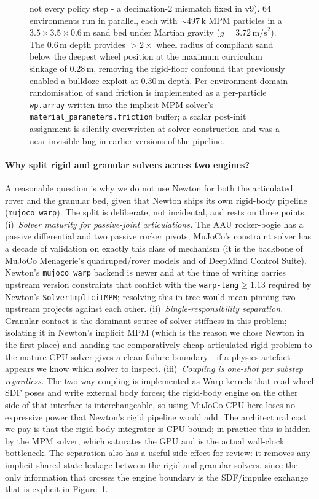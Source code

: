 \documentclass[conference]{IEEEtran}
\begin{document}
\begin{figure}[!htbp]
{    not every policy step - a decimation-2 mismatch fixed in v9). 64
    environments run in parallel, each with ${\sim}497$\,k MPM particles in a
    $3.5\times3.5\times0.6$\,m sand bed under Martian gravity
    ($g{=}3.72\,\text{m/s}^2$). The 0.6\,m depth provides $>2{\times}$ wheel
    radius of compliant sand below the deepest wheel position at the maximum
    curriculum sinkage of 0.28\,m, removing the rigid-floor confound that
    previously enabled a bulldoze exploit at 0.30\,m depth. Per-environment
    domain randomisation of sand friction is implemented as a per-particle
    \texttt{wp.array} written into the implicit-MPM solver's
    \texttt{material\_parameters.friction} buffer; a scalar post-init
    assignment is silently overwritten at solver construction and was a
    near-invisible bug in earlier versions of the pipeline.}
  \label{fig:physics_stack}
\end{figure}

\paragraph{Why split rigid and granular solvers across two engines?}
A reasonable question is why we do not use Newton for both the articulated
rover and the granular bed, given that Newton ships its own rigid-body
pipeline (\texttt{mujoco\_warp}). The split is deliberate, not incidental, and
rests on three points. (i)~\emph{Solver maturity for passive-joint
articulations.} The AAU rocker-bogie has a passive differential and two
passive rocker pivots; MuJoCo's constraint solver has a decade of validation
on exactly this class of mechanism (it is the backbone of MuJoCo Menagerie's
quadruped/rover models and of DeepMind Control Suite). Newton's
\texttt{mujoco\_warp} backend is newer and at the time of writing carries
upstream version constraints that conflict with the
\texttt{warp-lang${\geq}1.13$} required by Newton's
\texttt{SolverImplicitMPM}; resolving this in-tree would mean pinning
two upstream projects against each other. (ii)~\emph{Single-responsibility
separation.} Granular contact is the dominant source of solver stiffness in
this problem; isolating it in Newton's implicit MPM (which is the reason we
chose Newton in the first place) and handing the comparatively cheap
articulated-rigid problem to the mature CPU solver gives a clean failure
boundary - if a physics artefact appears we know which solver to inspect.
(iii)~\emph{Coupling is one-shot per substep regardless.} The two-way
coupling is implemented as Warp kernels that read wheel SDF poses and write
external body forces; the rigid-body engine on the other side of that
interface is interchangeable, so using MuJoCo CPU here loses no expressive
power that Newton's rigid pipeline would add. The architectural cost we pay is
that the rigid-body integrator is CPU-bound; in practice this is hidden by
the MPM solver, which saturates the GPU and is the actual wall-clock
bottleneck. The separation also has a useful side-effect for review: it
removes any implicit shared-state leakage between the rigid and granular
solvers, since the only information that crosses the engine boundary is the
SDF/impulse exchange that is explicit in
Figure~\ref{fig:physics_stack}.
\end{document}
